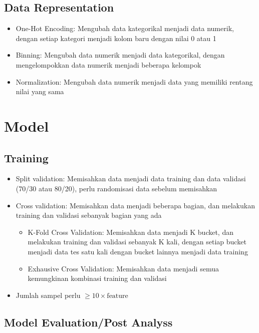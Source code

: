 \documentclass[conference]{IEEEtran}
\begin{document}
\subsection{Data Representation}
\begin{itemize}
    \item One-Hot Encoding: Mengubah data kategorikal menjadi data numerik, dengan setiap kategori menjadi kolom baru dengan nilai 0 atau 1
    \item Binning: Mengubah data numerik menjadi data kategorikal, dengan mengelompokkan data numerik menjadi beberapa kelompok
    \item Normalization: Mengubah data numerik menjadi data yang memiliki rentang nilai yang sama
\end{itemize}

\section{Model}

\subsection{Training}

\begin{itemize}
    \item Split validation: Memisahkan data menjadi data training dan data validasi (70/30 atau 80/20), perlu randomisasi data sebelum memisahkan
    \item Cross validation: Memisahkan data menjadi beberapa bagian, dan melakukan training dan validasi sebanyak bagian yang ada
    \begin{itemize}
        \item K-Fold Cross Validation: Memisahkan data menjadi K bucket, dan melakukan training dan validasi sebanyak K kali, dengan setiap bucket menjadi data tes satu kali dengan bucket lainnya menjadi data training
        \item Exhausive Cross Validation: Memisahkan data menjadi semua kemungkinan kombinasi training dan validasi
    \end{itemize}
    \item Jumlah sampel perlu \(\ge 10 \times \text{feature}\)
\end{itemize}

\subsection{Model Evaluation/Post Analyss}
\end{document}
